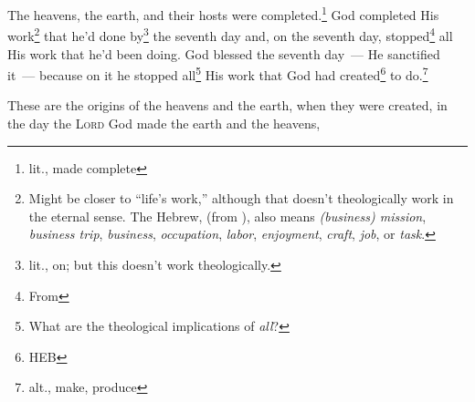 
\begin{inparaenum}
     The heavens, the earth, and their hosts were completed.\footnote{lit., made complete}%
     God completed His work\footnote{Might be closer to ``life's work,'' although that doesn't theologically work in the eternal sense. The Hebrew,  (from ), also means \textit{(business) mission}, \textit{business trip}, \textit{business}, \textit{occupation}, \textit{labor}, \textit{enjoyment}, \textit{craft}, \textit{job}, or \textit{task}.} that he'd done by\footnote{lit., on; but this doesn't work theologically.} the seventh day and, on the seventh day, stopped\footnote{From } all His work that he'd been doing.%
     God blessed the seventh day~--- He sanctified it~--- because on it he stopped all\footnote{What are the theological implications of \textit{all}?} His work that God had created\footnote{HEB } to do.\footnote{alt., make, produce}%
    
     These are the origins of the heavens and the earth, when they were created, in the day the \textsc{Lord} God made the earth and the heavens,%
    

\end{inparaenum}
